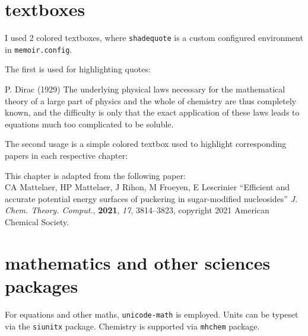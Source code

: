 \section{textboxes}
I used 2 colored textboxes, where \verb=shadequote= is a custom configured environment in  \verb=memoir.config=.

The first is used for highlighting quotes:

\begin{shadequote}[r]{P. Dirac (1929)\autocite{Dirac1929}}
The underlying physical laws necessary for the mathematical theory of a large part of physics and the whole of chemistry are thus completely known, and the difficulty is only that the exact application of these laws leads to equations much too complicated to be soluble.
\end{shadequote}

The second usage is a simple colored textbox used to highlight corresponding papers in each respective chapter:
\begin{tcolorbox}[colback={shadecolor},outer arc=0mm,colframe={shadecolor}]
This chapter is adapted from the following paper:\\
CA Mattelaer, HP Mattelaer, J Rihon, M Froeyen, E Lescrinier ``Efficient and accurate potential energy surfaces of puckering in sugar-modified nucleosides'' \textit{J. Chem. Theory. Comput.}, \textbf{2021}, \textit{17}, 3814--3823, copyright 2021 American Chemical Society.
\end{tcolorbox}


\section{mathematics and other sciences packages}

For equations and other maths, \verb=unicode-math= is employed. Units can be typeset via the \verb=siunitx= package. Chemistry is supported via \verb=mhchem= package. 